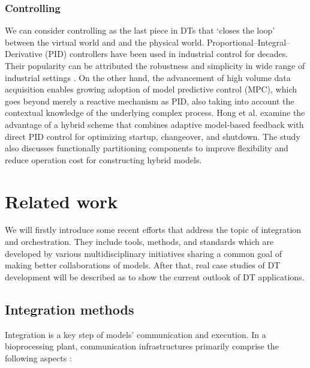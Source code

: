 \documentclass[journal,onecolumn]{IEEEtran} %
\begin{document}
\subsubsection{Controlling}
We can consider controlling as the last piece in DTs that `closes the loop' between the virtual world and and the physical world. Proportional–Integral–Derivative (PID) controllers have been used  in industrial control for decades. Their popularity can be attributed the robustness and simplicity in wide range of industrial settings \cite{pidni}. On the other hand, the advancement of high volume data acquisition enables growing adoption of model predictive control (MPC), which goes beyond merely a reactive mechanism as PID, also taking into account the contextual knowledge of the underlying complex process. Hong et al. \cite{Hong2018} examine the advantage of a hybrid scheme that combines adaptive model-based feedback with direct PID control for optimizing startup, changeover, and shutdown. The study also discusses functionally partitioning components to improve flexibility and reduce operation cost for constructing hybrid models.  

\pagebreak
\section{Related work}\label{sec:relatedworks}
We will firstly introduce some recent efforts that address the topic of integration and orchestration. They include tools, methods, and standards which are developed by various multidisciplinary initiatives sharing a common goal of making better collaborations of models. After that, real case studies of DT development will be described as to show the current outlook of DT applications.      

\subsection{Integration methods}
Integration is a key step of models' communication and execution. In a bioprocessing plant, communication infrastructures primarily comprise the following aspects \cite{Gargalo2020}:
\end{document}
